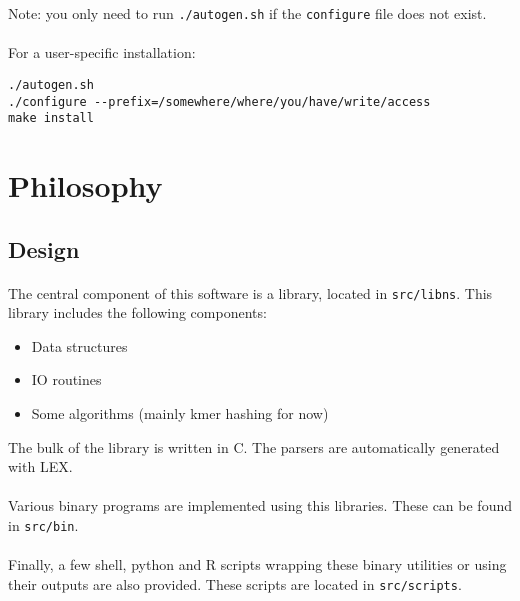 \documentclass[a4paper,12pt]{article}
\begin{document}
Note: you only need to run \texttt{./autogen.sh} if the \texttt{configure} file
does not exist.

\paragraph{}
For a user-specific installation:

\begin{verbatim}
./autogen.sh
./configure --prefix=/somewhere/where/you/have/write/access
make install
\end{verbatim}



\section{Philosophy}


\subsection{Design}

\paragraph{}
The central component of this software is a library, located in
\texttt{src/libns}.
This library includes the following components:
\begin{itemize}
    \item Data structures
    \item IO routines
    \item Some algorithms (mainly kmer hashing for now)
\end{itemize}
The bulk of the library is written in C.
The parsers are automatically generated with LEX.

\paragraph{}
Various binary programs are implemented using this libraries.
These can be found in \texttt{src/bin}.

\paragraph{}
Finally, a few shell, python and R scripts wrapping these binary utilities or
using their outputs are also provided.
These scripts are located in \texttt{src/scripts}.
\end{document}

